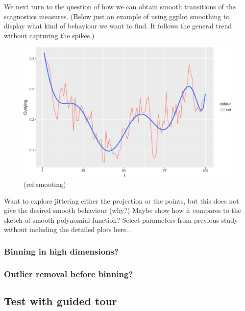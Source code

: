 \documentclass[article]{jss}
\begin{document}
We next turn to the question of how we can obtain smooth transitions of
the scagnostics measures. (Below just an example of using ggplot
smoothing to display what kind of behaviour we want to find. It follows
the general trend without capturing the spikes.)

\begin{CodeChunk}
\begin{figure}

{\centering \includegraphics[width=\textwidth]{figure/smoothing-1} 

}

\caption[(ref:smooting)]{(ref:smooting)}\label{fig:smoothing}
\end{figure}
\end{CodeChunk}

Want to explore jittering either the projection or the points, but this
does not give the desired smooth behaviour (why?) Maybe show how it
compares to the sketch of smooth polynomial function? Select parameters
from previous study without including the detailed plots here..

\subsubsection{Binning in high
dimensions?}\label{binning-in-high-dimensions}

\subsubsection{Outlier removal before
binning?}\label{outlier-removal-before-binning}

\subsection{Test with guided tour}\label{test-with-guided-tour}
\end{document}

